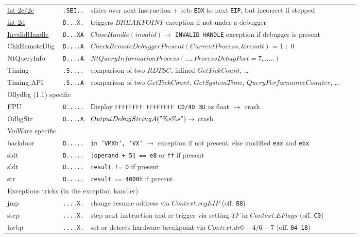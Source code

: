 \begin{tabular}{lllll}
\href{http://corkami.blogspot.com/2010/03/si-cest-ton-corps-qui-bouge-cest-ton.html}
{int 2c/2e} 			& {\tt .SEI..} & slides over next instruction + sets {\tt EDX} to next {\tt EIP}, but incorrect if stepped\\
\href{http://corkami.blogspot.com/2010/02/and-when-i-start-to-come-undone-stitch.html}
{int 2d}			& {\tt D...X.} & triggers $BREAKPOINT$ exception if not under a debugger\\
\href{http://corkami.blogspot.com/2010/02/and-when-i-start-to-come-undone-stitch.html}
{InvalidHandle}		& {\tt D...XA} & $CloseHandle(invalid) \rightarrow$ {\tt INVALID HANDLE} exception if debugger is present\\
ChkRemoteDbg		& {\tt D....A} & $CheckRemoteDebuggerPresent(CurrentProcess, \&result)$ = 1 :\ 0\\
NtQueryInfo			& {\tt D....A} & $NtQueryInformationProcess(..., ProcessDebugPort = 7, .....)$ \\
Timing			& {\tt .S....} & comparison of two $RDTSC$, inlined $GetTickCount$\footnotemark, \ldots\\
Timing API			& {\tt .S...A} & comparison of two $GetTickCount$, $GetSystemTime$, $QueryPerformanceCounter$, \ldots \\
\midrule
\multicolumn{3}{l}{Ollydbg (1.1) specific} \\
\midrule
FPU				& {\tt D.....} & Display {\tt FFFFFFFF FFFFFFFF C0/40 3D} as float $\rightarrow$ crash \\
OdbgStr			& {\tt D....A} & $OutputDebugStringA("\%s\%s") \rightarrow$ crash \\ 
\midrule
VmWare specific \\
\midrule
backdoor			& {\tt D.....} & {\tt in 'VMXh', 'VX'} $\rightarrow$ exception if not present, else modified {\tt eax} and {\tt ebx} \\
sidt				& {\tt D.....} & {\tt [operand + 5] == e8} or {\tt ff} if present \\
sldt				& {\tt D.....} & {\tt result != 0} if present \\
str				& {\tt D.....} & {\tt result == 4000h} if present \\
\midrule
\multicolumn{3}{l}{Exceptions tricks (in the exception handler)} \\
\midrule
jmp				& {\tt ....X.} & change resume address via $Context.regEIP$ (off. {\tt B8})\\
step				& {\tt ....X.} & step next instruction and re-trigger via setting $TF$ in $Context.EFlags$ (off. {\tt C0})\\
hwbp				& {\tt ....X.} & set or detects hardware breakpoint via $Context.dr0-4/6-7$ (off. {\tt 04-18})\\
\bottomrule
\end{tabular}

